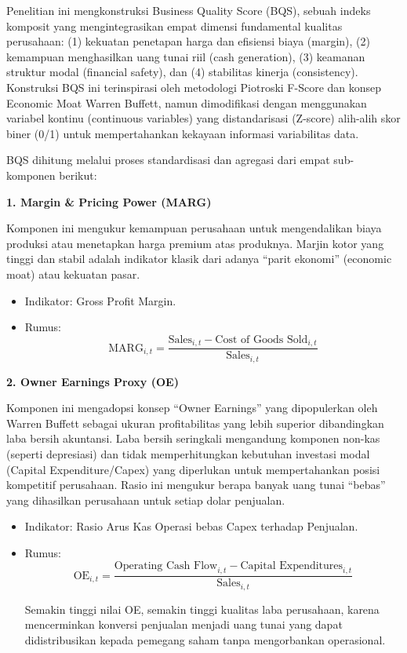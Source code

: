 \documentclass[12pt,a4paper]{report}
\providecommand{\tightlist}{%
  \setlength{\itemsep}{0pt}\setlength{\parskip}{0pt}%
}
\begin{document}
Penelitian ini mengkonstruksi Business Quality Score (BQS), sebuah
indeks komposit yang mengintegrasikan empat dimensi fundamental kualitas
perusahaan: (1) kekuatan penetapan harga dan efisiensi biaya (margin),
(2) kemampuan menghasilkan uang tunai riil (cash generation), (3)
keamanan struktur modal (financial safety), dan (4) stabilitas kinerja
(consistency). Konstruksi BQS ini terinspirasi oleh metodologi Piotroski
F-Score dan konsep Economic Moat Warren Buffett, namun dimodifikasi
dengan menggunakan variabel kontinu (continuous variables) yang
distandarisasi (Z-score) alih-alih skor biner (0/1) untuk mempertahankan
kekayaan informasi variabilitas data.

BQS dihitung melalui proses standardisasi dan agregasi dari empat
sub-komponen berikut:

\textbf{1. Margin \& Pricing Power (MARG)}

Komponen ini mengukur kemampuan perusahaan untuk mengendalikan biaya
produksi atau menetapkan harga premium atas produknya. Marjin kotor yang
tinggi dan stabil adalah indikator klasik dari adanya ``parit ekonomi''
(economic moat) atau kekuatan pasar.

\begin{itemize}
\tightlist
\item
  Indikator: Gross Profit Margin.
\item
  Rumus: \[
  \mathrm{MARG}_{i,t} = \frac{\text{Sales}_{i,t} - \text{Cost of Goods Sold}_{i,t}}{\text{Sales}_{i,t}}
  \]
\end{itemize}

\textbf{2. Owner Earnings Proxy (OE)}

Komponen ini mengadopsi konsep ``Owner Earnings'' yang dipopulerkan oleh
Warren Buffett sebagai ukuran profitabilitas yang lebih superior
dibandingkan laba bersih akuntansi. Laba bersih seringkali mengandung
komponen non-kas (seperti depresiasi) dan tidak memperhitungkan
kebutuhan investasi modal (Capital Expenditure/Capex) yang diperlukan
untuk mempertahankan posisi kompetitif perusahaan. Rasio ini mengukur
berapa banyak uang tunai ``bebas'' yang dihasilkan perusahaan untuk
setiap dolar penjualan.

\begin{itemize}
\item
  Indikator: Rasio Arus Kas Operasi bebas Capex terhadap Penjualan.
\item
  Rumus: \[
  \mathrm{OE}_{i,t} = \frac{\text{Operating Cash Flow}_{i,t} - \text{Capital Expenditures}_{i,t}}{\text{Sales}_{i,t}}
  \]

  Semakin tinggi nilai OE, semakin tinggi kualitas laba perusahaan,
  karena mencerminkan konversi penjualan menjadi uang tunai yang dapat
  didistribusikan kepada pemegang saham tanpa mengorbankan operasional.
\end{itemize}
\end{document}
